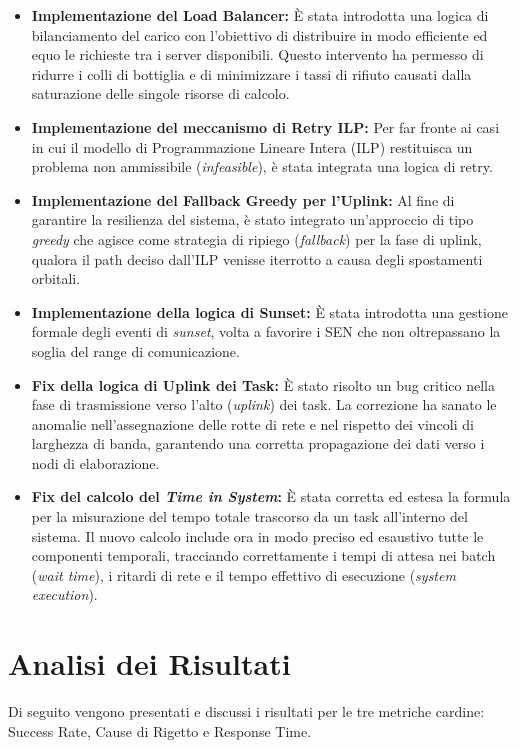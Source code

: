 \documentclass[11pt,a4paper]{article}
\begin{document}
\begin{itemize}
    \item \textbf{Implementazione del Load Balancer:} È stata introdotta una logica di bilanciamento del carico con l'obiettivo di distribuire in modo efficiente ed equo le richieste tra i server disponibili. Questo intervento ha permesso di ridurre i colli di bottiglia e di minimizzare i tassi di rifiuto causati dalla saturazione delle singole risorse di calcolo.
    
    \item \textbf{Implementazione del meccanismo di Retry ILP:} Per far fronte ai casi in cui il modello di Programmazione Lineare Intera (ILP) restituisca un problema non ammissibile (\textit{infeasible}), è stata integrata una logica di retry. 
    
    \item \textbf{Implementazione del Fallback Greedy per l'Uplink:} Al fine di garantire la resilienza del sistema, è stato integrato un'approccio di tipo \textit{greedy} che agisce come strategia di ripiego (\textit{fallback}) per la fase di uplink, qualora il path deciso dall'ILP venisse iterrotto a causa degli spostamenti orbitali.
    
    \item \textbf{Implementazione della logica di Sunset:} È stata introdotta una gestione formale degli eventi di \textit{sunset}, volta a favorire i SEN che non oltrepassano la soglia del range di comunicazione.
    
    \item \textbf{Fix della logica di Uplink dei Task:} È stato risolto un bug critico nella fase di trasmissione verso l'alto (\textit{uplink}) dei task. La correzione ha sanato le anomalie nell'assegnazione delle rotte di rete e nel rispetto dei vincoli di larghezza di banda, garantendo una corretta propagazione dei dati verso i nodi di elaborazione.
    
    \item \textbf{Fix del calcolo del \textit{Time in System}:} È stata corretta ed estesa la formula per la misurazione del tempo totale trascorso da un task all'interno del sistema. Il nuovo calcolo include ora in modo preciso ed esaustivo tutte le componenti temporali, tracciando correttamente i tempi di attesa nei batch (\textit{wait time}), i ritardi di rete e il tempo effettivo di esecuzione (\textit{system execution}).
\end{itemize}

\section{Analisi dei Risultati}
Di seguito vengono presentati e discussi i risultati per le tre metriche cardine: Success Rate, Cause di Rigetto e Response Time.
\end{document}
